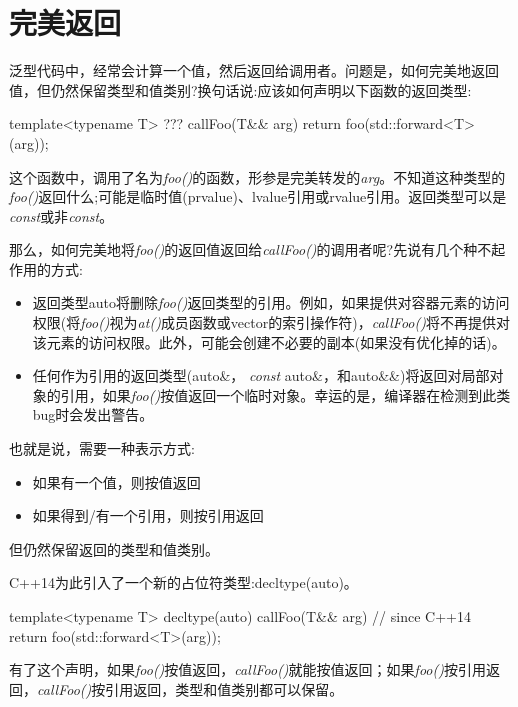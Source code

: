\section{完美返回}
泛型代码中，经常会计算一个值，然后返回给调用者。问题是，如何完美地返回值，但仍然保留类型和值类别?换句话说:应该如何声明以下函数的返回类型:

\begin{cppcode}
template<typename T>
??? callFoo(T&& arg)
{
	return foo(std::forward<T>(arg));
}
\end{cppcode}

这个函数中，调用了名为\textit{foo()}的函数，形参是完美转发的\textit{arg}。不知道这种类型的\textit{foo()}返回什么;可能是临时值(prvalue)、lvalue引用或rvalue引用。返回类型可以是\textit{const}或非\textit{const}。

那么，如何完美地将\textit{foo()}的返回值返回给\textit{callFoo()}的调用者呢?先说有几个种不起作用的方式:

\begin{itemize}
	\item 返回类型auto将删除\textit{foo()}返回类型的引用。例如，如果提供对容器元素的访问权限(将\textit{foo()}视为\textit{at()}成员函数或vector的索引操作符)，\textit{callFoo()}将不再提供对该元素的访问权限。此外，可能会创建不必要的副本(如果没有优化掉的话)。
	\item 任何作为引用的返回类型(auto\&， \textit{const} auto\&，和auto\&\&)将返回对局部对象的引用，如果\textit{foo()}按值返回一个临时对象。幸运的是，编译器在检测到此类bug时会发出警告。
\end{itemize}

也就是说，需要一种表示方式:

\begin{itemize}
	\item 如果有一个值，则按值返回
	\item 如果得到/有一个引用，则按引用返回
\end{itemize}

但仍然保留返回的类型和值类别。

C++14为此引入了一个新的占位符类型:decltype(auto)。

\begin{cppcode}
template<typename T>
decltype(auto) callFoo(T&& arg) // since C++14
{
	return foo(std::forward<T>(arg));
}
\end{cppcode}

有了这个声明，如果\textit{foo()}按值返回，\textit{callFoo()}就能按值返回；如果\textit{foo()}按引用返回，\textit{callFoo()}按引用返回，类型和值类别都可以保留。











































